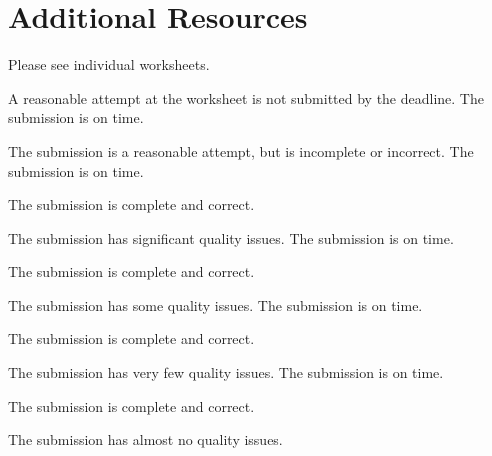 \documentclass{../../fal_assignment}
\begin{document}
\section*{Additional Resources}

Please see individual worksheets.


\begin{markingrubric}
%
        \grade\fail	A reasonable attempt at the worksheet is not submitted by the deadline.
        \grade 		The submission is on time.
        \par		The submission is a reasonable attempt, but is incomplete or incorrect.
        \grade 		The submission is on time.
        \par 		The submission is complete and correct.
        \par		The submission has significant quality issues.
        \grade 		The submission is on time.
        \par 		The submission is complete and correct.
        \par		The submission has some quality issues.
        \grade 		The submission is on time.
        \par 		The submission is complete and correct.
        \par		The submission has very few quality issues.
        \grade 		The submission is on time.
        \par 		The submission is complete and correct.
        \par		The submission has almost no quality issues.
\end{markingrubric}
\end{document}
